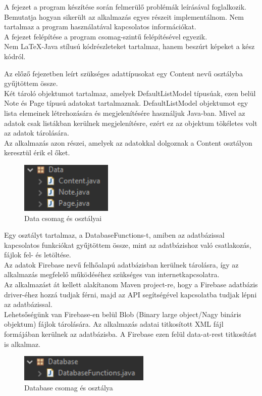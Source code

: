 A fejezet a program készítése során felmerülő problémák leírásával foglalkozik. Bemutatja hogyan sikerült az alkalmazás egyes részeit implementálnom. Nem tartalmaz a program használatával kapcsolatos információkat. 
\\A fejezet felépítése a program csomag-szintű felépítésével egyezik.
\\Nem LaTeX-Java stílusú kódrészleteket tartalmaz, hanem beszúrt képeket a kész kódról.

Az előző fejezetben leírt szükséges adattípusokat egy Content nevű osztályba gyűjtöttem össze.
\vspace{5pt}\\Két tároló objektumot tartalmaz, amelyek DefaultListModel típusúak, ezen belül Note és Page típusú adatokat tartalmaznak. DefaultListModel objektumot egy lista elemeinek létrehozására és megjelenítésére használjuk Java-ban. Mivel az adatok csak listákban kerülnek megjelenítésre, ezért ez az objektum tökéletes volt az adatok tárolására.
\vspace{5pt}\\Az alkalmazás azon részei, amelyek az adatokkal dolgoznak a Content osztályon keresztül érik el őket.
\begin{figure}[h]
	\centering
	\includegraphics[scale=0.7]{images/package_data.png}
	\caption{Data csomag és osztályai}
	\label{fig:package_data}
\end{figure}

Egy osztályt tartalmaz, a DatabaseFunctions-t, amiben az adatbázissal kapcsolatos funkciókat gyűjtöttem össze, mint az adatbázishoz való csatlakozás, fájlok fel- és letöltése.
\vspace{5pt}\\Az adatok Firebase nevű felhőalapú adatbázisban kerülnek tárolásra, így az alkalmazás megfelelő működéséhez szükséges van internetkapcsolatra.
\\Az alkalmazást át kellett alakítanom Maven project-re, hogy a Firebase adatbázis driver-éhez hozzá tudjak férni, majd az API segítségével kapcsolatba tudjak lépni az adatbázissal.
\\Lehetsőségünk van Firebase-en belül Blob (Binary large object/Nagy bináris objektum) fájlok tárolására. Az alkalmazás adatai titkosított XML fájl formájában kerülnek az adatbázisba. A Firebase ezen felül data-at-rest titkosítást is alkalmaz.
\begin{figure}[h]
	\centering
	\includegraphics[scale=0.7]{images/package_database.png}
	\caption{Database csomag és osztálya}
	\label{fig:package_database}
\end{figure}

